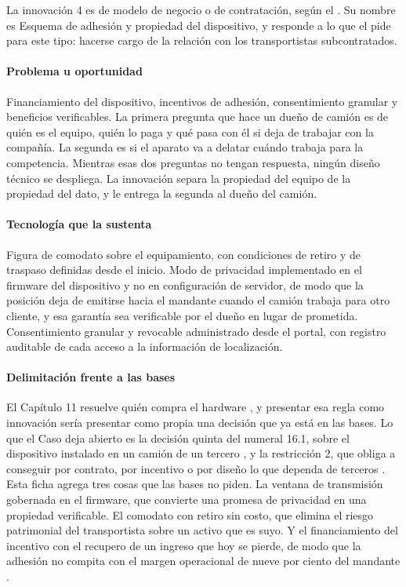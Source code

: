 La innovación 4 es de modelo de negocio o de contratación, según el . Su nombre es
Esquema de adhesión y propiedad del dispositivo, y responde a lo que el  pide
para este tipo: hacerse cargo de la relación con los transportistas subcontratados.

\paragraph{Problema u oportunidad} Financiamiento del dispositivo, incentivos de adhesión,
consentimiento granular y beneficios verificables. La primera pregunta que hace un dueño de camión es
de quién es el equipo, quién lo paga y qué pasa con él si deja de trabajar con la compañía. La segunda
es si el aparato va a delatar cuándo trabaja para la competencia. Mientras esas dos preguntas no tengan
respuesta, ningún diseño técnico se despliega. La innovación separa la propiedad del equipo de la
propiedad del dato, y le entrega la segunda al dueño del camión.

\paragraph{Tecnología que la sustenta} Figura de comodato sobre el equipamiento, con condiciones de
retiro y de traspaso definidas desde el inicio. Modo de privacidad implementado en el firmware del
dispositivo y no en configuración de servidor, de modo que la posición deja de emitirse hacia el
mandante cuando el camión trabaja para otro cliente, y esa garantía sea verificable por el dueño en
lugar de prometida. Consentimiento granular y revocable administrado desde el portal, con registro
auditable de cada acceso a la información de localización.

\paragraph{Delimitación frente a las bases} El Capítulo 11 resuelve quién compra el hardware
, y presentar esa regla como innovación sería presentar como propia una decisión
que ya está en las bases. Lo que el Caso deja abierto es la decisión quinta del numeral 16.1, sobre el
dispositivo instalado en un camión de un tercero , y la restricción 2, que
obliga a conseguir por contrato, por incentivo o por diseño lo que dependa de terceros
. Esta ficha agrega tres cosas que las bases no piden. La ventana de transmisión
gobernada en el firmware, que convierte una promesa de privacidad en una propiedad verificable. El
comodato con retiro sin costo, que elimina el riesgo patrimonial del transportista sobre un activo que
es suyo. Y el financiamiento del incentivo con el recupero de un ingreso que hoy se pierde, de modo que
la adhesión no compita con el margen operacional de nueve por ciento del mandante
.

